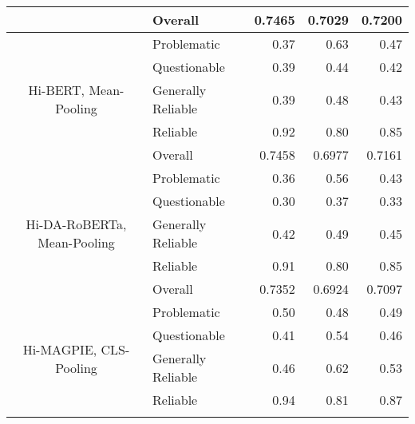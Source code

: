 \begin{table}[htbp]
\begin{longtable}{| c | l | r | r | r |}
                                                          & Overall            & 0.7465             & 0.7029          & 0.7200          \\
        \hline
        \multirow{5}{*}{Hi-BERT, Mean-Pooling}            & Problematic        & 0.37               & 0.63            & 0.47            \\
                                                          & Questionable       & 0.39               & 0.44            & 0.42            \\
                                                          & Generally Reliable & 0.39               & 0.48            & 0.43            \\
                                                          & Reliable           & 0.92               & 0.80            & 0.85            \\\cline{2-5}
                                                          & Overall            & 0.7458             & 0.6977          & 0.7161          \\
        \hline
        \multirow{5}{*}{Hi-DA-RoBERTa, Mean-Pooling}      & Problematic        & 0.36               & 0.56            & 0.43            \\
                                                          & Questionable       & 0.30               & 0.37            & 0.33            \\
                                                          & Generally Reliable & 0.42               & 0.49            & 0.45            \\
                                                          & Reliable           & 0.91               & 0.80            & 0.85            \\\cline{2-5}
                                                          & Overall            & 0.7352             & 0.6924          & 0.7097          \\
        \hline
        \multirow{5}{*}{Hi-MAGPIE, CLS-Pooling}           & Problematic        & 0.50               & 0.48            & 0.49            \\
                                                          & Questionable       & 0.41               & 0.54            & 0.46            \\
                                                          & Generally Reliable & 0.46               & 0.62            & 0.53            \\
                                                          & Reliable           & 0.94               & 0.81            & 0.87            \\\cline{2-5}

\end{longtable}
\end{table}
